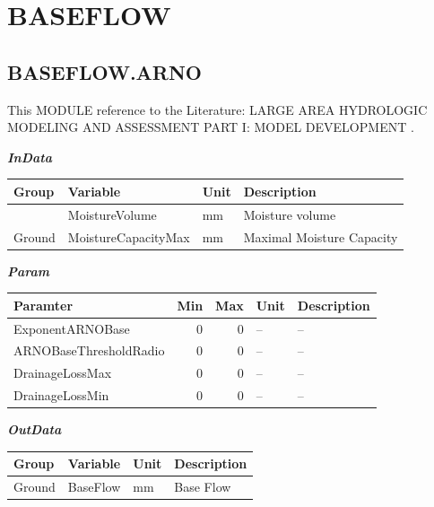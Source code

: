 \documentclass[
]{book}
\begin{document}
\hypertarget{BASEFLOW}{%
\section{BASEFLOW}\label{BASEFLOW}}

\hypertarget{BASEFLOW.ARNO}{%
\subsection{BASEFLOW.ARNO}\label{BASEFLOW.ARNO}}

This MODULE reference to the Literature: LARGE AREA HYDROLOGIC MODELING AND ASSESSMENT PART I: MODEL DEVELOPMENT \citep{Arnold.1998}.

\textbf{\emph{InData}}

\begin{table}[!h]
\centering
\begin{tabular}{l|l|l|l}
\hline
Group & Variable & Unit & Description\\
\hline
 & MoistureVolume & mm & Moisture volume\\
\cline{2-4}
\multirow{-2}{*}{\raggedright\arraybackslash Ground} & MoistureCapacityMax & mm & Maximal Moisture Capacity\\
\hline
\end{tabular}
\end{table}

\textbf{\emph{Param}}

\begin{table}[!h]
\centering
\begin{tabular}{l|r|r|l|l}
\hline
Paramter & Min & Max & Unit & Description\\
\hline
ExponentARNOBase & 0 & 0 & -- & --\\
\cline{1-5}
ARNOBaseThresholdRadio & 0 & 0 & -- & --\\
\cline{1-5}
DrainageLossMax & 0 & 0 & -- & --\\
\cline{1-5}
DrainageLossMin & 0 & 0 & -- & --\\
\hline
\end{tabular}
\end{table}

\textbf{\emph{OutData}}

\begin{table}[!h]
\centering
\begin{tabular}{l|l|l|l}
\hline
Group & Variable & Unit & Description\\
\hline
Ground & BaseFlow & mm & Base Flow\\
\hline
\end{tabular}
\end{table}
\end{document}
